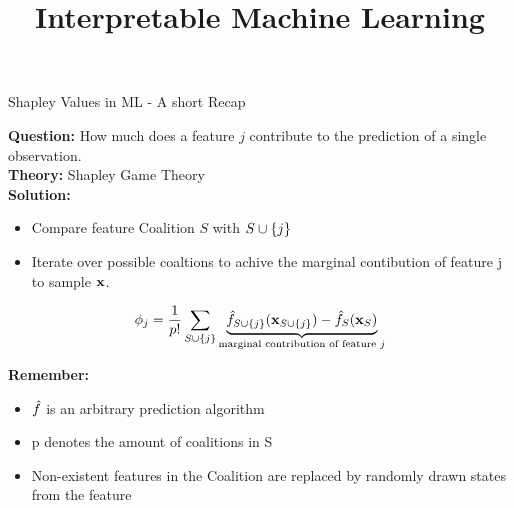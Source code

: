 \documentclass[11pt,compress,t,notes=noshow, aspectratio=169, xcolor=table]{beamer}
\title{Interpretable Machine Learning}
\date{}
\begin{document}
\newcommand{\titlefigure}{slides/shapley/figure_man/exSHAP.png}
\newcommand{\learninggoals}{
\item Get an intuition of additive feature attributions
\item Understand the concept of Kernel SHAP
\item Ability to interpret SHAP plots
\item Global SHAP methods
}


\begin{vbframe}{Shapley Values in ML - A short Recap}
  
  \textbf{Question:} How much does a feature $j$ contribute to the prediction of a single observation. \\
  \textbf{Theory:} Shapley Game Theory \\
  \textbf{Solution:} 
  \begin{itemize}
    \item Compare feature Coalition $S$ with $\Scupj$ 
    \item Iterate over possible coaltions to achive the marginal contibution of feature j to sample $\xv$. 
\end{itemize}

     $$ \phi_j  = \frac{1}{p!} \sum_{\Scupj} \underbrace{\fh_{\Scupj}(\xv_{\Scupj}) - \fh_{S}(\xv_{S})}_{\text{marginal contribution of feature $j$}} $$

\textbf{Remember:}

\begin{itemize}
    \item $\fh$ is an arbitrary prediction algorithm
    \item p denotes the amount of coalitions in S
    \item Non-existent features in the Coalition are replaced by randomly drawn states from the feature
\end{itemize}

\end{vbframe}
\end{document}
